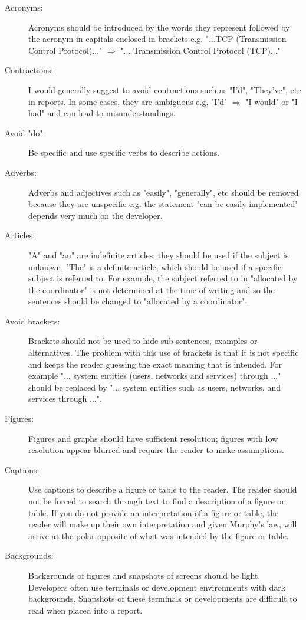\begin{description}
	\item [Acronyms:] Acronyms should be introduced by the words they represent followed by the acronym in capitals enclosed in brackets e.g. "...TCP (Transmission Control Protocol)..." $\Rightarrow$  "... Transmission Control Protocol (TCP)..."
	\item [Contractions:] I would generally suggest to avoid contractions such as "I'd", "They've", etc in reports. In some cases, they are ambiguous e.g. "I'd" $\Rightarrow$ "I would" or "I had" and can lead to misunderstandings.
	\item [Avoid "do":] Be specific and use specific verbs to describe actions.
	\item [Adverbs:] Adverbs and adjectives such as "easily", "generally", etc should be removed because they are unspecific e.g. the statement "can be easily implemented" depends very much on the developer. 
	\item [Articles:] "A" and "an" are indefinite articles; they should be used if the subject is unknown. "The" is a definite article; which should be used if a specific subject is referred to. For example, the subject referred to in "allocated by the coordinator" is not determined at the time of writing and so the sentences should be changed to "allocated by a coordinator".
	\item [Avoid brackets:] Brackets should not be used to hide sub-sentences, examples or alternatives. The problem with this use of brackets is that it is not specific and keeps the reader guessing the exact meaning that is intended. For example "... system entities (users, networks and services) through ..." should be replaced by "... system entities such as users, networks, and services through ...".
	\item [Figures:] Figures and graphs should have sufficient resolution; figures with low resolution appear blurred and require the reader to make assumptions.
	\item  [Captions:] Use captions to describe a figure or table to the reader. The reader should not be forced to search through text to find a description of a figure or table. If you do not provide an interpretation of a figure or table, the reader will make up their own interpretation and given Murphy's law, will arrive at the polar opposite of what was intended by the figure or table.
	\item [Backgrounds:] Backgrounds of figures and snapshots of screens should be light. Developers often use terminals or development environments with dark backgrounds. Snapshots of these terminals or developments are difficult to read when placed into a report. 

\end{description}
